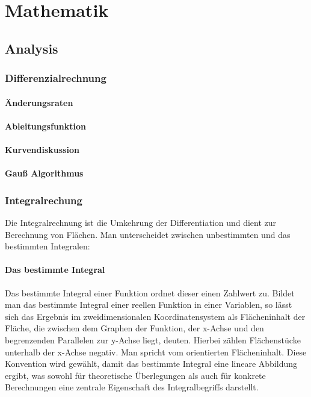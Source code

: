 \documentclass[a4paper,10pt,DIV9, BCOR12mm, oneside,openright,openbib]{scrreprt}
\theoremstyle{definition}
\theoremstyle{plain}
\begin{document}
\tableofcontents
\listoffigures

\part{Mathematik}

\chapter{Analysis}

\section{Differenzialrechnung}
\subsection{Änderungsraten}
\subsection{Ableitungsfunktion}

\subsection{Kurvendiskussion}


\subsection{Gauß Algorithmus}

\section{Integralrechung}
Die Integralrechnung ist die Umkehrung der Differentiation und dient zur Berechnung von Flächen. Man unterscheidet zwischen unbestimmten und das bestimmten Integralen:

\subsection{Das bestimmte Integral}
Das bestimmte Integral einer Funktion ordnet dieser einen Zahlwert zu. Bildet man das bestimmte Integral einer reellen Funktion in einer Variablen, so lässt sich das Ergebnis im zweidimensionalen Koordinatensystem als Flächeninhalt der Fläche, die zwischen dem Graphen der Funktion, der x-Achse und den begrenzenden Parallelen zur y-Achse liegt, deuten. Hierbei zählen Flächenstücke unterhalb der x-Achse negativ. Man spricht vom orientierten Flächeninhalt. Diese Konvention wird gewählt, damit das bestimmte Integral eine lineare Abbildung ergibt, was sowohl für theoretische Überlegungen als auch für konkrete Berechnungen eine zentrale Eigenschaft des Integralbegriffs darstellt.
\end{document}
